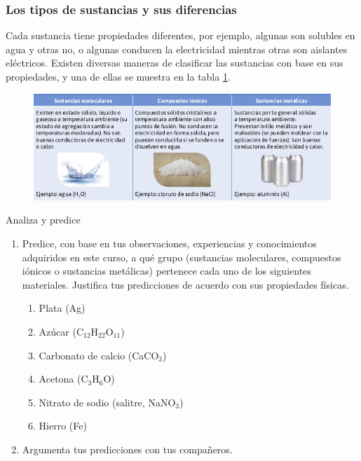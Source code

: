 \documentclass[11pt]{book}
\begin{document}
\subsubsection{Los tipos de sustancias y sus diferencias}
Cada sustancia tiene propiedades diferentes, por ejemplo, algunas son solubles
en agua y otras no, o algunas conducen la electricidad mientras otras son aislantes
eléctricos. Existen diversas maneras de clasificar las sustancias con base en sus
propiedades, y una de ellas se muestra en la tabla \ref{tab:tabla_sustancias2}.

\begin{figure}[H]
  \centering
  \includegraphics[width=\textwidth]{tabla_sustancias2.png}
  \label{tab:tabla_sustancias2}
\end{figure}

\begin{boxK}
  Analiza y predice
  \begin{enumerate}
    \item Predice, con base en tus observaciones, experiencias y conocimientos adquiridos en este curso, a qué grupo
          (sustancias moleculares, compuestos iónicos o sustancias metálicas) pertenece cada uno de los siguientes materiales.
          Justifica tus predicciones de acuerdo con sus propiedades físicas.
          \begin{enumerate}
            \item Plata (Ag)
            \item Azúcar (C$_{12}$H$_{22}$O$_{11}$)
            \item Carbonato de calcio (CaCO$_3$)
            \item Acetona (C$_3$H$_6$O)
            \item Nitrato de sodio (salitre, NaNO$_3$)
            \item Hierro (Fe)
          \end{enumerate}
    \item Argumenta tus predicciones con tus compañeros.
  \end{enumerate}
\end{boxK}
\end{document}
